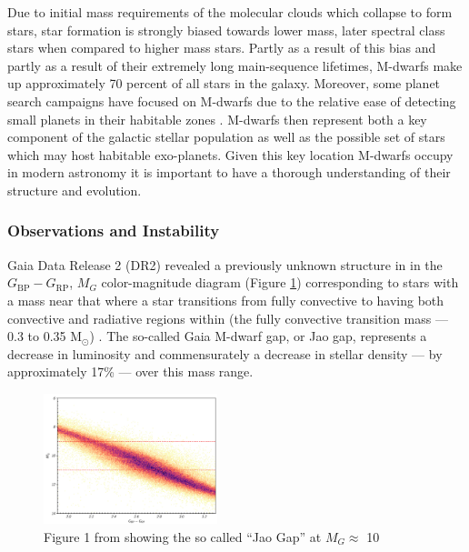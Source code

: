 Due to initial mass requirements of the molecular clouds which collapse to form
stars, star formation is strongly biased towards lower mass, later spectral
class stars when compared to higher mass stars. Partly as a result of this
bias and partly as a result of their extremely long main-sequence lifetimes,
M-dwarfs make up approximately 70 percent of all stars in the galaxy.
Moreover, some planet search campaigns have focused on M-dwarfs due to the
relative ease of detecting small planets in their habitable zones
\citep[e.g.][]{Nut08}. M-dwarfs then represent both a key component of the
galactic stellar population as well as the possible set of stars which may host
habitable exo-planets. Given this key location M-dwarfs occupy in modern
astronomy it is important to have a thorough understanding of their structure
and evolution.

\subsubsection{Observations and Instability}
Gaia Data Release 2 (DR2) revealed a previously unknown structure in in the
$G_{\text{BP}}-G_{\text{RP}}$, $M_{G}$ color-magnitude diagram (Figure
\ref{fig:JaoGap}) corresponding to stars with a mass near that where a star
transitions from fully convective to having both convective and radiative
regions within (the fully convective transition mass --- 0.3 to 0.35
M$_{\odot}$) \citep{Jao2018,Baraffe2018}. The so-called Gaia M-dwarf gap, or
Jao gap, represents a decrease in luminosity and commensurately a decrease in
stellar density --- by approximately 17\% --- over this mass range.


\begin{figure}
	\centering
	\includegraphics[width=0.45\textwidth]{src/Figures/JaoGap.png}
	\caption{Figure 1 from \citet{Jao2018} showing the so called ``Jao Gap'' at
	$M_{G}\approx$ 10}
	\label{fig:JaoGap}
\end{figure}

